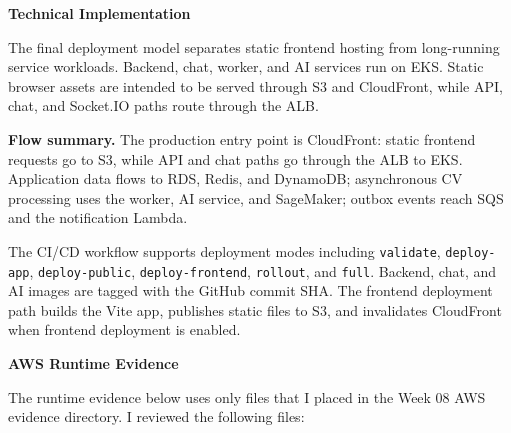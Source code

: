 \vspace{0.5em}\noindent\textbf{Technical Implementation}\par

The final deployment model separates static frontend hosting from
long-running service workloads. Backend, chat, worker, and AI services
run on EKS. Static browser assets are intended to be served through S3
and CloudFront, while API, chat, and Socket.IO paths route through the
ALB.

\textbf{Flow summary.} The production entry point is CloudFront: static
frontend requests go to S3, while API and chat paths go through the ALB
to EKS. Application data flows to RDS, Redis, and DynamoDB; asynchronous
CV processing uses the worker, AI service, and SageMaker; outbox events
reach SQS and the notification Lambda.

The CI/CD workflow supports deployment modes including
\texttt{validate}, \texttt{deploy-\allowbreak{}app}, \texttt{deploy-\allowbreak{}public},
\texttt{deploy-\allowbreak{}frontend}, \texttt{rollout}, and \texttt{full}. Backend,
chat, and AI images are tagged with the GitHub commit SHA. The frontend
deployment path builds the Vite app, publishes static files to S3, and
invalidates CloudFront when frontend deployment is enabled.

\vspace{0.5em}\noindent\textbf{AWS Runtime Evidence}\par

The runtime evidence below uses only files that I placed in the Week 08
AWS evidence directory. I reviewed the following files:

